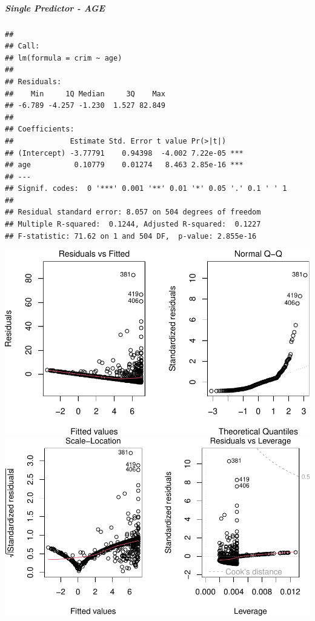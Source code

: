 \documentclass[
]{article}
\begin{document}
\hypertarget{single-predictor---age}{%
\subparagraph{\texorpdfstring{\textbf{Single Predictor -
AGE}}{Single Predictor - AGE}}\label{single-predictor---age}}

\begin{verbatim}
## 
## Call:
## lm(formula = crim ~ age)
## 
## Residuals:
##    Min     1Q Median     3Q    Max 
## -6.789 -4.257 -1.230  1.527 82.849 
## 
## Coefficients:
##             Estimate Std. Error t value Pr(>|t|)    
## (Intercept) -3.77791    0.94398  -4.002 7.22e-05 ***
## age          0.10779    0.01274   8.463 2.85e-16 ***
## ---
## Signif. codes:  0 '***' 0.001 '**' 0.01 '*' 0.05 '.' 0.1 ' ' 1
## 
## Residual standard error: 8.057 on 504 degrees of freedom
## Multiple R-squared:  0.1244, Adjusted R-squared:  0.1227 
## F-statistic: 71.62 on 1 and 504 DF,  p-value: 2.855e-16
\end{verbatim}

\includegraphics{Disha_Gandhi_Take_Home_Exam_PDF_files/figure-latex/unnamed-chunk-23-1.pdf}
\includegraphics{Disha_Gandhi_Take_Home_Exam_PDF_files/figure-latex/unnamed-chunk-23-2.pdf}
\end{document}
